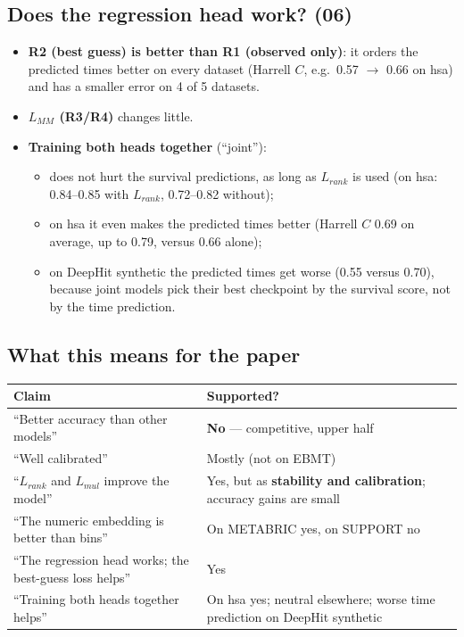 \documentclass[11pt]{article}
\begin{document}
\subsection{Does the regression head work? (06)}
\begin{itemize}
  \item \textbf{R2 (best guess) is better than R1 (observed only)}: it orders the predicted times
        better on every dataset (Harrell $C$, e.g.\ 0.57 $\rightarrow$ 0.66 on hsa) and has a smaller
        error on 4 of 5 datasets.
  \item \textbf{$L_{MM}$ (R3/R4)} changes little.
  \item \textbf{Training both heads together} (``joint''):
        \begin{itemize}
          \item does not hurt the survival predictions, as long as $L_{rank}$ is used (on hsa:
                0.84--0.85 with $L_{rank}$, 0.72--0.82 without);
          \item on hsa it even makes the predicted times better (Harrell $C$ 0.69 on average, up to
                0.79, versus 0.66 alone);
          \item on DeepHit synthetic the predicted times get worse (0.55 versus 0.70), because joint
                models pick their best checkpoint by the survival score, not by the time prediction.
        \end{itemize}
\end{itemize}

\subsection{What this means for the paper}
\begin{table}[H]
\centering
\begin{tabularx}{\textwidth}{lY}
\toprule
Claim & Supported? \\
\midrule
``Better accuracy than other models'' & \textbf{No} --- competitive, upper half \\
``Well calibrated'' & Mostly (not on EBMT) \\
``$L_{rank}$ and $L_{mul}$ improve the model'' & Yes, but as \textbf{stability and calibration};
  accuracy gains are small \\
``The numeric embedding is better than bins'' & On METABRIC yes, on SUPPORT no \\
``The regression head works; the best-guess loss helps'' & Yes \\
``Training both heads together helps'' & On hsa yes; neutral elsewhere; worse time prediction on
  DeepHit synthetic \\
\bottomrule
\end{tabularx}
\end{table}
\end{document}
